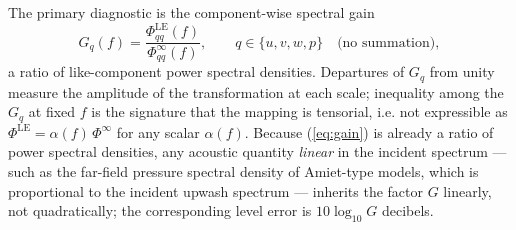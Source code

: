 \documentclass[lineno]{JFM-FLM_Au}
\begin{document}
The primary diagnostic is the component-wise spectral gain
\begin{equation}
  G_q(f)
  = \frac{\Phi^{\mathrm{LE}}_{qq}(f)}{\Phi^{\infty}_{qq}(f)},
  \qquad q \in \{u,v,w,p\}
  \quad\text{(no summation)},
  \label{eq:gain}
\end{equation}
a ratio of like-component power spectral densities. Departures of $G_q$
from unity measure the amplitude of the transformation at each scale;
inequality among the $G_q$ at fixed $f$ is the signature that the mapping
is tensorial, i.e. not expressible as
$\Phi^{\mathrm{LE}} = \alpha(f)\,\Phi^{\infty}$ for any scalar
$\alpha(f)$. Because (\ref{eq:gain}) is already a ratio of power spectral
densities, any acoustic quantity \emph{linear} in the incident spectrum
--- such as the far-field pressure spectral density of Amiet-type models,
which is proportional to the incident upwash spectrum
\citep{Amiet1975} --- inherits the factor $G$ linearly, not
quadratically; the corresponding level error is $10\log_{10}G$ decibels.
\end{document}
